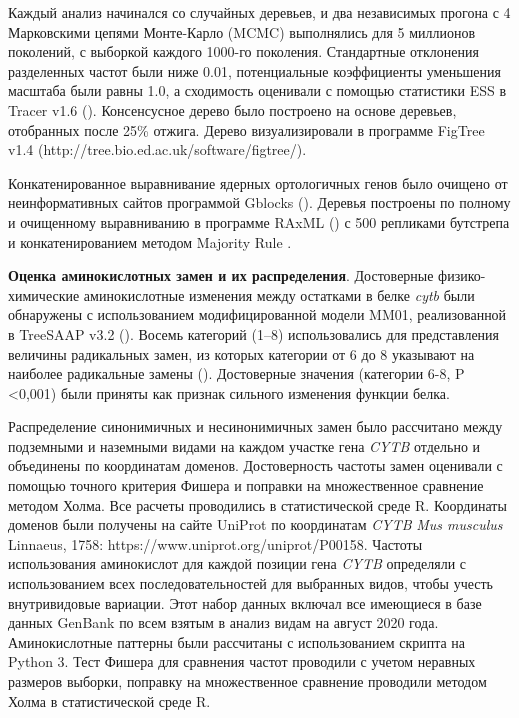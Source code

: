 Каждый анализ начинался со случайных деревьев, и два независимых прогона с 4 Марковскими цепями Монте-Карло (MCMC) выполнялись для 5 миллионов поколений, с выборкой каждого 1000-го поколения. Стандартные отклонения разделенных частот были ниже 0.01, потенциальные коэффициенты уменьшения масштаба были равны 1.0, а сходимость оценивали с помощью статистики ESS в Tracer v1.6 (\cite{Rambaut2014}). Консенсусное дерево было построено на основе деревьев, отобранных после 25\% отжига. Дерево визуализировали в программе FigTree v1.4 (http://tree.bio.ed.ac.uk/software/figtree/).

Конкатенированное выравнивание ядерных ортологичных генов было очищено от неинформативных сайтов программой Gblocks (\cite{Castresana2000}). Деревья построены по полному и очищенному выравниванию в программе RAxML (\cite{Stamatakis2014}) с 500 репликами бутстрепа и конкатенированием методом Majority Rule . 

\textbf{Оценка аминокислотных замен и их распределения}. Достоверные физико-химические аминокислотные изменения между остатками в белке \textit{cytb} были обнаружены с использованием модифицированной модели MM01, реализованной в TreeSAAP v3.2 (\cite{Woolley2003}). Восемь категорий (1–8) использовались для представления величины радикальных замен, из которых категории от 6 до 8 указывают на наиболее радикальные замены (\cite{McClellan2001}). Достоверные значения (категории 6-8, P <0,001) были приняты как признак сильного изменения функции белка. 

Распределение синонимичных и несинонимичных замен было рассчитано между подземными и наземными видами на каждом участке гена \textit{CYTB} отдельно и объединены по координатам доменов. Достоверность частоты замен оценивали с помощью точного критерия Фишера и поправки на множественное сравнение методом Холма. Все расчеты проводились в статистической среде R. Координаты доменов были получены на сайте UniProt по координатам \textit{CYTB} \textit{Mus musculus} Linnaeus, 1758: https://www.uniprot.org/uniprot/P00158. Частоты использования аминокислот для каждой позиции гена \textit{CYTB} определяли с использованием всех последовательностей для выбранных видов, чтобы учесть внутривидовые вариации. Этот набор данных включал все имеющиеся в базе данных GenBank по всем взятым в анализ видам на август 2020 года. Аминокислотные паттерны были рассчитаны с использованием скрипта на Python 3. Тест Фишера для сравнения частот проводили с учетом неравных размеров выборки, поправку на множественное сравнение проводили методом Холма в статистической среде R.

